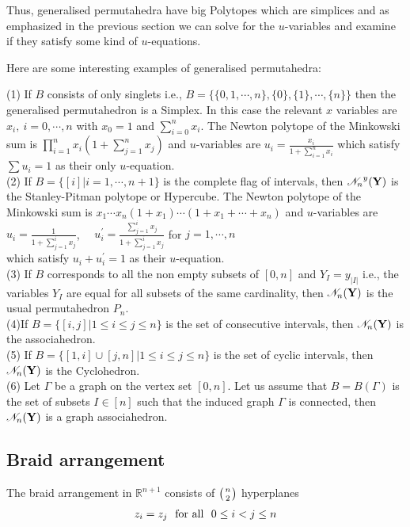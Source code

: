 \documentclass[hidelinks,12pt]{article}
\newcommand{\bea}[1]{\begin{eqnarray}\label{#1} }
\newcommand{\eea}{\end{eqnarray}}
\def\bea{\begin{eqnarray}}
\def\eea{\end{eqnarray}}
\begin{document}
Thus, generalised permutahedra have big Polytopes which are simplices and as emphasized in the previous section we can solve for the $u$-variables and examine if they satisfy some kind of $u$-equations.

Here are some interesting examples of generalised permutahedra:

(1) If $B$ consists of only singlets i.e., $B=\{ \{ 0,1,\cdots,n \}, \{ 0 \},\{ 1 \},\cdots ,\{ n \} \}$ then the generalised permutahedron is a Simplex. In this case the relevant $x$ variables are $x_i,~ i=0,\cdots,n$ with $x_0=1$ and $\sum_{i=0}^n x_i$. 
The Newton polytope of the Minkowski sum is $\prod_{i=1}^{n} x_i (1+\sum_{j=1}^{n} x_j)$ and $u$-variables are 
$u_i =\frac{ x_i}{1+\sum_{i=1}^n x_i} $
which satisfy $\sum u_i =1$ as their only $u$-equation. \\

(2) If $B= \{[i] | i=1,\cdots,n+1 \}$ is the complete flag of intervals, then ${\mathscr N_n}^y({\bf Y})$ is the Stanley-Pitman polytope or Hypercube.
The Newton polytope of the Minkowski sum is $x_1\cdots x_n (1+x_1) \cdots (1+x_1+\cdots +x_n)$ and $u$-variables are 
$u_i =\frac{ 1}{1+\sum_{j=1}^{i} x_j} $, ~~$u^{'}_i =\frac{ \sum_{j=1}^{i} x_j}{1+\sum_{j=1}^{i} x_j} $ for $j=1,\cdots,n$ \\
which satisfy $u_i +u^{'}_{i} =1$ as their $u$-equation. \\

(3) If $B$ corresponds to all the non empty subsets of $[0,n]$ and $Y_I =y_{|I|}$ i.e., the variables $Y_I$ are equal for all subsets of the same cardinality, then ${\mathscr N_n}({\bf Y})$ is the usual permutahedron $P_n$. \\

(4)If $B=\{ [i,j] | 1\leq  i \leq j \leq n\}$ is the set of consecutive intervals, then ${\mathscr N_n}({\bf Y})$ is the associahedron. \\

(5) If $B=\{ [1,i] \cup [j,n] | 1\leq  i \leq j \leq n\}$ is the set of cyclic intervals, then ${\mathscr N_n}({\bf Y})$ is the Cyclohedron.\\

(6) Let $\Gamma$ be a graph on the vertex set $[0,n]$. Let us assume that $B = B(\Gamma)$ is the set of subsets $I \in [n]$ such that the induced graph $\Gamma$ is connected, then  ${\mathscr N_n}({\bf Y})$ is a graph associahedron.\\

\subsection*{Braid arrangement}
The braid arrangement in $\mathbb{R}^{n+1}$ consists of $\left({n}\atop{2}\right)$ hyperplanes 
\bea
z_i =z_j ~~{\rm for ~ all}~~0 \leq i<j \leq n
\eea 
\end{document}
